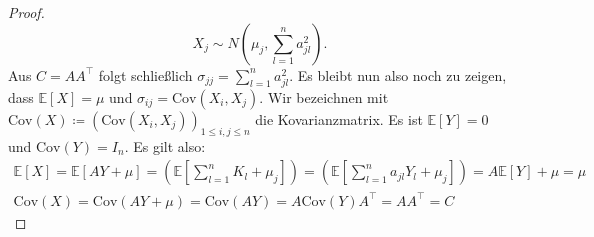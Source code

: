 \begin{proof}
	\[
		X_j\sim N \left( \mu_j,\sum_{l=1}^{n}a_{jl}^2 \right).
	\]
	Aus $ C = A A^{\top}  $ folgt schließlich $ \sigma_{jj} = \sum_{l=1}^{n} a_{jl}^2 $.
	Es bleibt nun also noch zu zeigen, dass $ \mathbb{E}[X] = \mu $ und $ \sigma_{ij} = \text{Cov}(X_i,X_j) $.
	Wir bezeichnen mit $ \text{Cov}(X) \coloneqq (\text{Cov}(X_i,X_j))_{1 \leq i,j \leq n} $
	die Kovarianzmatrix.
	Es ist $ \mathbb{E}[Y] = 0 $ und  $\text{Cov}(Y) = I_n $.
	Es gilt also:
	\begin{align*}
		\mathbb{E}[X] = \mathbb{E}[AY + \mu] = (\mathbb{E}[\sum_{l=1}^{n}K_l+\mu_j]) =(\mathbb{E}[\sum_{l=1}^{n}a_{jl}Y_l+\mu_j])= A \mathbb{E}[Y] + \mu = \mu \\
		\text{Cov}(X) = \text{Cov}(AY + \mu) =  \text{Cov}(AY) = A \text{Cov}(Y) A^{\top} = AA^{\top} = C
	\end{align*}
	
	
	
	
	
	
\end{proof}